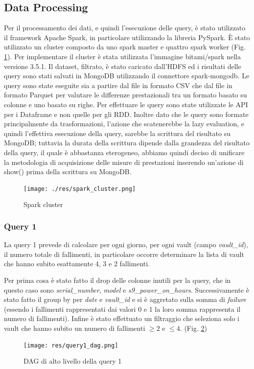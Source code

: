 \documentclass[conference]{IEEEtran}
\begin{document}
\subsection{Data Processing}
Per il processamento dei dati, e quindi l'esecuzione delle query, è stato utilizzato il framework Apache Spark, in particolare utilizzando la libreria PySpark. È stato utilizzato un cluster composto da uno spark master e quattro spark worker (Fig. \ref{fig:spark_cluster}). Per implementare il cluster è stata utilizzata l'immagine bitami/spark nella versione 3.5.1.
Il dataset, filtrato, è stato caricato dall'HDFS ed i risultati delle query sono stati salvati in MongoDB utilizzando il connettore spark-mongodb.
Le query sono state eseguite sia a partire dal file in formato CSV che dal file in formato Parquet per valutare le differenze prestazionali tra un formato basato su colonne e uno basato su righe.
Per effettuare le query sono state utilizzate le API per i Dataframe e non quelle per gli RDD. 
Inoltre dato che le query sono formate principalmente da trasformazioni, l'azione che scatenerebbe la lazy evaluation, e quindi l'effettiva esecuzione della query, sarebbe la scrittura del risultato su MongoDB; tuttavia la durata della scrittura dipende dalla grandezza del risultato della query, il quale è abbastanza eterogeneo, abbiamo quindi deciso di unificare la metodologia di acquisizione delle misure di prestazioni inserendo un'azione di show() prima della scrittura su MongoDB.
\begin{figure}[H]
    \centering
    \texttt{[image: ./res/spark\_cluster.png]}
    \caption{Spark cluster}
    \label{fig:spark_cluster}
\end{figure}
\subsubsection{Query 1}
La query 1 prevede di calcolare per ogni giorno, per ogni vault (campo \textit{vault\_id}), il numero totale di fallimenti, in particolare occorre determinare la lista di vault che hanno subito esattamente 4, 3 e 2 fallimenti.

Per prima cosa è stato fatto il drop delle colonne inutili per la query, che in questo caso sono \textit{serial\_number}, \textit{model} e \textit{s9\_power\_on\_hours}. Successivamente è stato fatto il group by per \textit{date} e \textit{vault\_id} e si è aggretato sulla somma di \textit{failure} (essendo i fallimenti rappresentati dai valori 0 e 1 la loro somma rappresenta il numero di fallimenti). Infine è stato effettuato un filtraggio che seleziona solo i vault che hanno subito un numero di fallimenti $\geq2$ e $\leq4$. (Fig. \ref{fig:dag_query1})
\begin{figure}[H]
    \centerline{\texttt{[image: res/query1\_dag.png]}}
    \caption{DAG di alto livello della query 1}
    \label{fig:dag_query1}
\end{figure}
\end{document}

